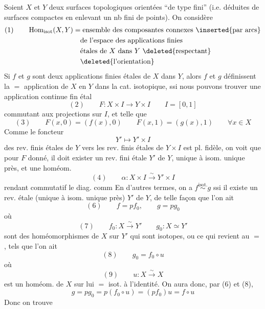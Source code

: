 Soient $X$ et $Y$ deux surfaces topologiques  orientées ``de type fini'' (i.e. déduites de surfaces compactes en enlevant un nb fini de points). On considère
\[
\begin{aligned}
(1)\qquad \operatorname{Hom}_{\mathrm{isot}}(X,Y)
&=\text{ensemble des composantes connexes \inserted{par arcs}}\\
&\quad\text{de l'espace des applications finies}\\
&\quad\text{étales de $X$ dans $Y$ \deleted{respectant}}\\
&\quad\deleted{\text{l'orientation}}
\end{aligned}
\]
Si $f$ et $g$ sont deux applications finies étales de $X$ dans $Y$, alors $f$ et $g$  définissent la $=$  application de $X$ en $Y$ dans la cat. isotopique, ssi nous pouvons trouver une application continue fin étal
\[
(2)\qquad F:X\times I\longrightarrow Y\times I\qquad I=[0,1]
\]
commutant aux projections sur $I$, et telle que
\[
(3)\qquad F(x,0)=(f(x),0)\qquad F(x,1)=(g(x),1)\qquad\forall x\in X
\]
Comme le foncteur
\[
Y'\longmapsto Y'\times I
\]
des rev. finis étales de $Y$ vers les rev. finis étales de $Y\times I$ est pl. fidèle, on voit que  pour $F$ donné, il doit exister un rev. fini étale $Y'$ de $Y$, unique à isom. unique près, et une homéom.
\[
(4)\qquad \alpha:X\times I\xrightarrow{\sim}Y'\times I
\]
rendant commutatif le diag. comm
En d'autres termes, on a $f\overset{\mathrm{isot.}}{\sim}g$ ssi il existe un rev.  étale (unique à isom. unique près) $Y'$ de $Y$, de telle façon que l'on ait
\[
(6)\qquad f=pf_0,\qquad g=pg_0
\]
où
\[
(7)\qquad f_0:X\xrightarrow{\sim}Y'\qquad g_0:X\simeq Y'
\]
sont des homéomorphismes de $X$ sur $Y'$ qui sont isotopes, ou ce qui revient au $=$, tels que l'on ait
\[
(8)\qquad g_0=f_0\circ u
\]
où
\[
(9)\qquad u:X\xrightarrow{\sim}X
\]
 est un homéom. de $X$ sur lui $=$ isot. à l'identité. On aura donc, par (6) et (8),
\[
g=pg_0=p(f_0\circ u)=(pf_0)u=f\circ u
\]
Donc on trouve

